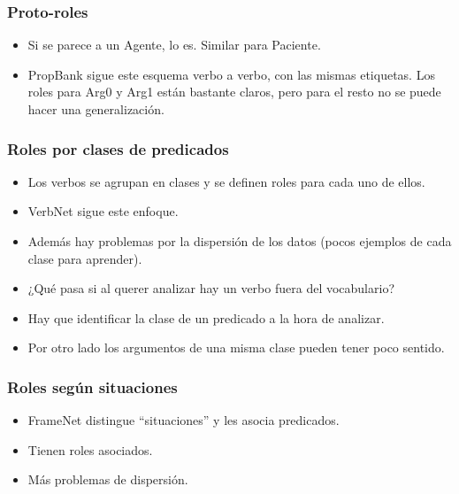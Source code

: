 \documentclass{beamer}
\begin{document}
\begin{frame}
  \frametitle{Proto-roles}

  \begin{itemize}
    \item Si se parece a un Agente, lo es. Similar para Paciente.

    \item PropBank sigue este esquema verbo a verbo, con las mismas etiquetas. Los roles para Arg0 y Arg1 están bastante claros, pero para el resto no se puede hacer una generalización.
  \end{itemize}
\end{frame}

\begin{frame}
  \frametitle{Roles por clases de predicados}

  \begin{itemize}
    \item Los verbos se agrupan en clases y se definen roles para cada uno de ellos.

    \item VerbNet sigue este enfoque.

    \item Además hay problemas por la dispersión de los datos (pocos ejemplos de cada clase para aprender).

    \item ¿Qué pasa si al querer analizar hay un verbo fuera del vocabulario?

    \item Hay que identificar la clase de un predicado a la hora de analizar.

    \item Por otro lado los argumentos de una misma clase pueden tener poco sentido.
  \end{itemize}
\end{frame}

\begin{frame}
  \frametitle{Roles según situaciones}

  \begin{itemize}
    \item FrameNet distingue ``situaciones'' y les asocia predicados.

    \item Tienen roles asociados.

    \item Más problemas de dispersión.
  \end{itemize}
\end{frame}
\end{document}
